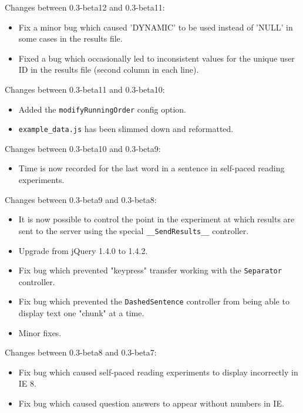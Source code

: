 \documentclass[
]{article}
\providecommand{\tightlist}{%
  \setlength{\itemsep}{0pt}\setlength{\parskip}{0pt}}
\begin{document}
Changes between 0.3-beta12 and 0.3-beta11:

\begin{itemize}
\tightlist
\item
  Fix a minor bug which caused 'DYNAMIC' to be used instead of 'NULL' in
  some cases in the results file.
\item
  Fixed a bug which occasionally led to inconsistent values for the
  unique user ID in the results file (second column in each line).
\end{itemize}

Changes between 0.3-beta11 and 0.3-beta10:

\begin{itemize}
\tightlist
\item
  Added the \texttt{modifyRunningOrder} config option.
\item
  \texttt{example\_data.js} has been slimmed down and reformatted.
\end{itemize}

Changes between 0.3-beta10 and 0.3-beta9:

\begin{itemize}
\tightlist
\item
  Time is now recorded for the last word in a sentence in self-paced
  reading experiments.
\end{itemize}

Changes between 0.3-beta9 and 0.3-beta8:

\begin{itemize}
\tightlist
\item
  It is now possible to control the point in the experiment at which
  results are sent to the server using the special
  \texttt{\_\_SendResults\_\_} controller.
\item
  Upgrade from jQuery 1.4.0 to 1.4.2.
\item
  Fix bug which prevented "keypress" transfer working with the
  \texttt{Separator} controller.
\item
  Fix bug which prevented the \texttt{DashedSentence} controller from
  being able to display text one "chunk" at a time.
\item
  Minor fixes.
\end{itemize}

Changes between 0.3-beta8 and 0.3-beta7:

\begin{itemize}
\tightlist
\item
  Fix bug which caused self-paced reading experiments to display
  incorrectly in IE 8.
\item
  Fix bug which caused question answers to appear without numbers in IE.
\end{itemize}
\end{document}
